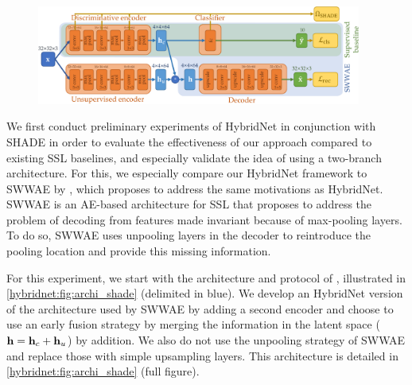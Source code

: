 \begin{figure}[t]
	\centering
	\includegraphics[width=0.95\textwidth]{images/hybridnet_withshade}
    \label{hybridnet:fig:archi_shade}
\end{figure}

We first conduct preliminary experiments of HybridNet in conjunction with \ac{SHADE} in order to evaluate the effectiveness of our approach compared to existing \ac{SSL} baselines, and especially validate the idea of using a two-branch architecture. For this, we especially compare our HybridNet framework to \ac{SWWAE} by \citet{Zhao2016a}, which proposes to address the same motivations as HybridNet. \ac{SWWAE} is an \ac{AE}-based architecture for \ac{SSL} that proposes to address the problem of decoding from features made invariant because of max-pooling layers. To do so, \ac{SWWAE} uses unpooling layers in the decoder to reintroduce the pooling location and provide this missing information.

For this experiment, we start with the architecture and protocol of \citet{Zhao2016a}, illustrated in \autoref{hybridnet:fig:archi_shade} (delimited in blue). We develop an HybridNet version of the architecture used by \ac{SWWAE} by adding a second encoder and choose to use an early fusion strategy by merging the information in the latent space ($\mathbf{h} = \mathbf{h}_c + \mathbf{h}_u$) by addition. We also do not use the unpooling strategy of \ac{SWWAE} and replace those with simple upsampling layers. This architecture is detailed in \autoref{hybridnet:fig:archi_shade} (full figure).


